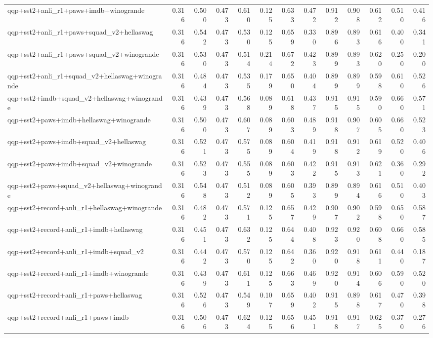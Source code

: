 \begin{table}[t]
\begin{tabular}{lrrrrrrrrrrrr}
    qqp+sst2+anli\_r1+paws+imdb+winogrande & 0.316 & 0.500 & 0.473 & 0.610 & 0.125 & 0.633 & 0.472 & 0.912 & 0.908 & 0.612 & 0.510 & 0.416 \\
    qqp+sst2+anli\_r1+paws+squad\_v2+hellaswag & 0.316 & 0.542 & 0.473 & 0.530 & 0.125 & 0.659 & 0.330 & 0.896 & 0.893 & 0.616 & 0.400 & 0.341 \\
    qqp+sst2+anli\_r1+paws+squad\_v2+winogrande & 0.316 & 0.530 & 0.473 & 0.514 & 0.214 & 0.672 & 0.423 & 0.899 & 0.893 & 0.620 & 0.250 & 0.200 \\
    qqp+sst2+anli\_r1+squad\_v2+hellaswag+winogrande & 0.316 & 0.484 & 0.473 & 0.535 & 0.179 & 0.650 & 0.404 & 0.899 & 0.899 & 0.598 & 0.610 & 0.526 \\
    qqp+sst2+imdb+squad\_v2+hellaswag+winogrande & 0.316 & 0.439 & 0.473 & 0.568 & 0.089 & 0.618 & 0.437 & 0.915 & 0.915 & 0.590 & 0.660 & 0.571 \\
    qqp+sst2+paws+imdb+hellaswag+winogrande & 0.316 & 0.500 & 0.473 & 0.607 & 0.089 & 0.603 & 0.489 & 0.918 & 0.907 & 0.605 & 0.660 & 0.523 \\
    qqp+sst2+paws+imdb+squad\_v2+hellaswag & 0.316 & 0.521 & 0.473 & 0.575 & 0.089 & 0.604 & 0.419 & 0.918 & 0.912 & 0.619 & 0.520 & 0.406 \\
    qqp+sst2+paws+imdb+squad\_v2+winogrande & 0.316 & 0.523 & 0.473 & 0.555 & 0.089 & 0.603 & 0.422 & 0.915 & 0.913 & 0.621 & 0.360 & 0.292 \\
    qqp+sst2+paws+squad\_v2+hellaswag+winogrande & 0.316 & 0.548 & 0.473 & 0.512 & 0.089 & 0.605 & 0.393 & 0.899 & 0.894 & 0.616 & 0.510 & 0.403 \\
    qqp+sst2+record+anli\_r1+hellaswag+winogrande & 0.316 & 0.482 & 0.473 & 0.571 & 0.125 & 0.657 & 0.429 & 0.907 & 0.902 & 0.598 & 0.650 & 0.587 \\
    qqp+sst2+record+anli\_r1+imdb+hellaswag & 0.316 & 0.451 & 0.473 & 0.632 & 0.125 & 0.644 & 0.408 & 0.923 & 0.920 & 0.608 & 0.660 & 0.585 \\
    qqp+sst2+record+anli\_r1+imdb+squad\_v2 & 0.316 & 0.442 & 0.473 & 0.570 & 0.125 & 0.642 & 0.360 & 0.920 & 0.918 & 0.611 & 0.440 & 0.187 \\
    qqp+sst2+record+anli\_r1+imdb+winogrande & 0.316 & 0.439 & 0.473 & 0.611 & 0.125 & 0.663 & 0.469 & 0.920 & 0.914 & 0.606 & 0.590 & 0.520 \\
    qqp+sst2+record+anli\_r1+paws+hellaswag & 0.316 & 0.526 & 0.473 & 0.549 & 0.107 & 0.659 & 0.402 & 0.915 & 0.898 & 0.617 & 0.470 & 0.398 \\
    qqp+sst2+record+anli\_r1+paws+imdb & 0.316 & 0.506 & 0.473 & 0.624 & 0.125 & 0.656 & 0.451 & 0.918 & 0.917 & 0.625 & 0.370 & 0.276 \\

\end{tabular}
\end{table}
